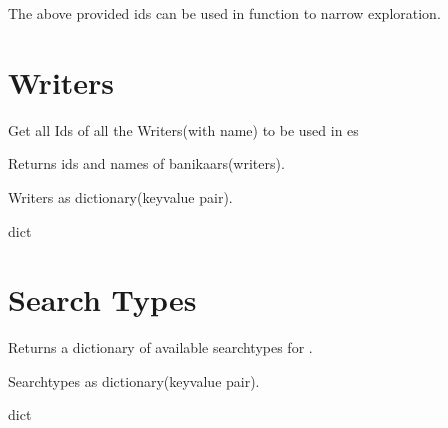 \documentclass[letterpaper,10pt,english]{sphinxmanual}
\begin{document}
\sphinxAtStartPar
The above provided ids can be used in  function to
narrow exploration.


\chapter{Writers}
\label{\detokenize{writers:writers}}\label{\detokenize{writers::doc}}
\sphinxAtStartPar
Get all Ids of all the Writers(with name) to be used in
es

\begin{sphinxVerbatim}[commandchars=\\\{\}]
\end{sphinxVerbatim}

\sphinxAtStartPar
Returns ids and names of banikaars(writers).

\sphinxAtStartPar
{}    Writers as dictionary(key\sphinxhyphen{}value pair).

\sphinxAtStartPar
{}    dict


\chapter{Search Types}
\label{\detokenize{searchtype:search-types}}\label{\detokenize{searchtype::doc}}
\begin{sphinxVerbatim}[commandchars=\\\{\}]
\end{sphinxVerbatim}

\sphinxAtStartPar
Returns a dictionary of available searchtypes for .

\sphinxAtStartPar
{}    Search\sphinxhyphen{}types as dictionary(key\sphinxhyphen{}value pair).

\sphinxAtStartPar
{}    dict

\begin{DUlineblock}{0em}
\item[] 
\end{DUlineblock}
\end{document}
